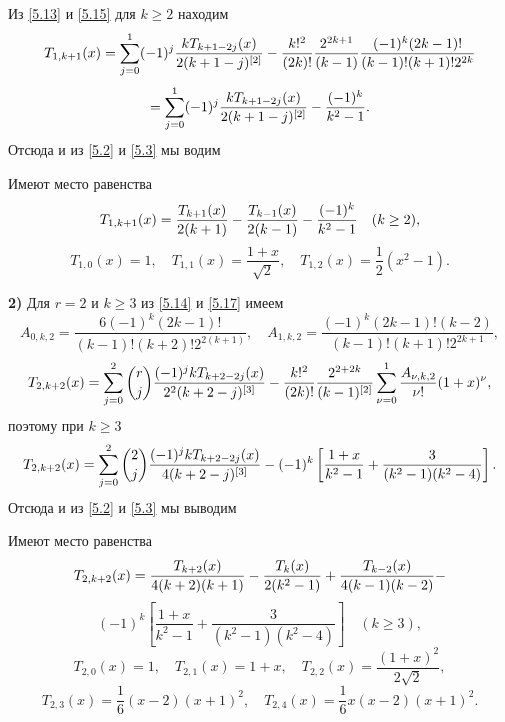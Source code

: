 Из \eqref{5.13} и \eqref{5.15}  для $k\ge2$ находим
$$
T_{1,k+1}(x)=\sum_{j=0}^1(-1)^j
{kT_{k+1-2j}(x)\over2(k+1-j)^{[2]}}-\frac{k!^2}{(2k)!}
\frac{2^{2k+1}}{(k-1)}\frac{(-1)^{k}(2k-1)!}{(k-1)!(k+1)!2^{2k}}
$$
$$
=\sum_{j=0}^1(-1)^j
{kT_{k+1-2j}(x)\over2(k+1-j)^{[2]}}-\frac{(-1)^k}{k^2-1}.
$$
Отсюда и из \eqref{5.2} и \eqref{5.3} мы водим
\begin{corollary} Имеют место равенства
\begin{equation}\label{5.16}
T_{1,k+1}(x)={T_{k+1}(x)\over2(k+1)}- {T_{k-1}(x)\over2(k-1)} -\frac{(-1)^k}{k^2-1}\quad (k\ge 2),
\end{equation}
\begin{equation}\label{5.17}
T_{1,0}(x)=1, \quad T_{1,1}(x)=\frac{1+x}{\sqrt{2}}, \quad T_{1,2}(x)=\frac12(x^2-1).
\end{equation}
\end{corollary}


\noindent\textbf{2)} Для $r=2$ и $k\ge3$ из \eqref{5.14} и \eqref{5.17} имеем
$$
A_{0,k,2}=\frac{6(-1)^{k}(2k-1)!}{(k-1)! (k+2)!2^{2(k+1)}},\quad A_{1,k,2}=\frac{(-1)^{k}(2k-1)!(k-2)}{(k-1)! (k+1)!2^{2k+1}},
$$
$$
T_{2,k+2}(x)=\sum_{j=0}^2{r\choose j}
{(-1)^jkT_{k+2-2j}(x)\over2^2(k+2-j)^{[3]}}
-\frac{k!^2}{(2k)!}
\frac{2^{2+2k}}{(k-1)^{[2]}}\sum^1_{\nu=0}\frac{A_{\nu,k,2}}{\nu!}(1+x)^{\nu},
$$
поэтому при $k\ge3$
$$
T_{2,k+2}(x)=\sum_{j=0}^2{2\choose j}
{(-1)^jkT_{k+2-2j}(x)\over4(k+2-j)^{[3]}}
-(-1)^k\left[\frac{1+x}{k^2-1}+\frac{3}{(k^2-1)(k^2-4)}\right].
$$
Отсюда и из \eqref{5.2} и \eqref{5.3} мы выводим
\begin{corollary} Имеют место равенства
$$
T_{2,k+2}(x)={T_{k+2}(x)\over4(k+2)(k+1)}-{T_{k}(x)\over2(k^2-1)}+
{T_{k-2}(x)\over4(k-1)(k-2)}-
$$
\begin{equation}\label{5.18}
(-1)^k\left[\frac{1+x}{k^2-1}+\frac{3}{(k^2-1)(k^2-4)}\right]\quad(k\ge3),
\end{equation}
\begin{equation}\label{5.19}
T_{2,0}(x)=1, \quad T_{2,1}(x)=1+x, \quad T_{2,2}(x)=\frac{(1+x)^2}{2\sqrt{2}},
\end{equation}
\begin{equation}\label{5.20}
T_{2,3}(x)=\frac16(x-2)(x+1)^2, \quad T_{2,4}(x)=\frac16x(x-2)(x+1)^2.
\end{equation}
\end{corollary}

